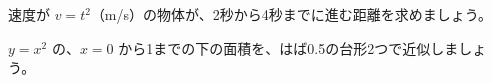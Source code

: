 \noindent\begin{minipage}[t]{0.485\linewidth}\vspace{0pt}\raggedright
\begin{jibun}
速度が $v=t^2$（m/s）の物体が、2秒から4秒までに進む距離を求めましょう。
\end{jibun}
\end{minipage}\hfill
\begin{minipage}[t]{0.485\linewidth}\vspace{0pt}\raggedright
\begin{jibun}
$y=x^2$ の、$x=0$ から1までの下の面積を、はば0.5の台形2つで近似しましょう。
\end{jibun}
\end{minipage}

